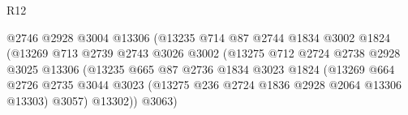 \begin{lexlean}{R12}
\begin{coremodule}
                                          @2746
                                          @2928
                                          @3004
                                          @13306
                                          (@13235
                                            @714
                                            @87
                                            @2744
                                            @1834
                                            @3002
                                            @1824
                                            (@13269
                                              @713
                                              @2739
                                              @2743
                                              @3026
                                              @3002
                                              (@13275
                                                @712
                                                @2724
                                                @2738
                                                @2928
                                                @3025
                                                @13306
                                                (@13235
                                                  @665
                                                  @87
                                                  @2736
                                                  @1834
                                                  @3023
                                                  @1824
                                                  (@13269
                                                    @664
                                                    @2726
                                                    @2735
                                                    @3044
                                                    @3023
                                                    (@13275
                                                      @236
                                                      @2724
                                                      @1836
                                                      @2928
                                                      @2064
                                                      @13306
                                                      @13303)
                                                    @3057)
                                                  @13302))
                                              @3063)

\end{coremodule}
\end{lexlean}

